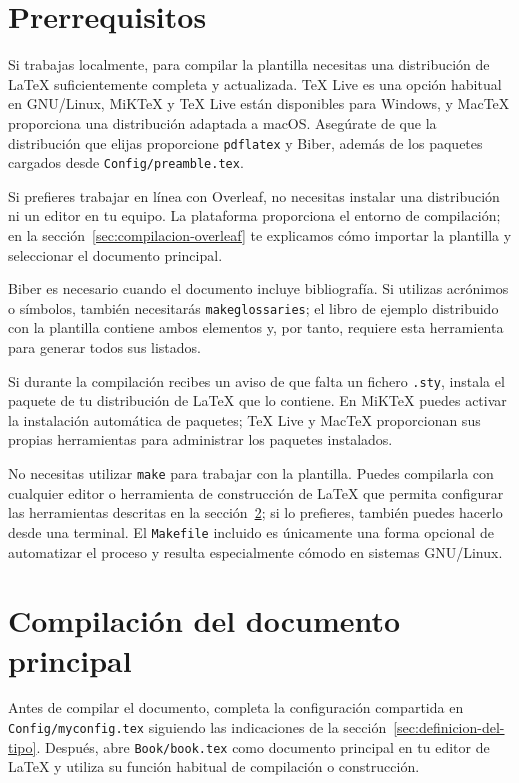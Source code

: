 \section{Prerrequisitos}
\label{sec:prerrequisitos}

Si trabajas localmente, para compilar la plantilla necesitas una distribución de \LaTeX{} suficientemente completa y actualizada. TeX Live es una opción habitual en GNU/Linux, MiKTeX y TeX Live están disponibles para Windows, y MacTeX proporciona una distribución adaptada a macOS. Asegúrate de que la distribución que elijas proporcione \texttt{pdflatex} y Biber, además de los paquetes cargados desde \texttt{Config/preamble.tex}.

Si prefieres trabajar en línea con Overleaf, no necesitas instalar una distribución ni un editor en tu equipo. La plataforma proporciona el entorno de compilación; en la sección~\ref{sec:compilacion-overleaf} te explicamos cómo importar la plantilla y seleccionar el documento principal.

Biber es necesario cuando el documento incluye bibliografía. Si utilizas acrónimos o símbolos, también necesitarás \texttt{makeglossaries}; el libro de ejemplo distribuido con la plantilla contiene ambos elementos y, por tanto, requiere esta herramienta para generar todos sus listados.

Si durante la compilación recibes un aviso de que falta un fichero \texttt{.sty}, instala el paquete de tu distribución de \LaTeX{} que lo contiene. En MiKTeX puedes activar la instalación automática de paquetes; TeX Live y MacTeX proporcionan sus propias herramientas para administrar los paquetes instalados.

No necesitas utilizar \texttt{make} para trabajar con la plantilla. Puedes compilarla con cualquier editor o herramienta de construcción de \LaTeX{} que permita configurar las herramientas descritas en la sección~\ref{sec:compilacion}; si lo prefieres, también puedes hacerlo desde una terminal. El \texttt{Makefile} incluido es únicamente una forma opcional de automatizar el proceso y resulta especialmente cómodo en sistemas GNU/Linux.


\section{Compilación del documento principal}
\label{sec:compilacion}

Antes de compilar el documento, completa la configuración compartida en \texttt{Config/myconfig.tex} siguiendo las indicaciones de la sección~\ref{sec:definicion-del-tipo}. Después, abre \texttt{Book/book.tex} como documento principal en tu editor de \LaTeX{} y utiliza su función habitual de compilación o construcción.

